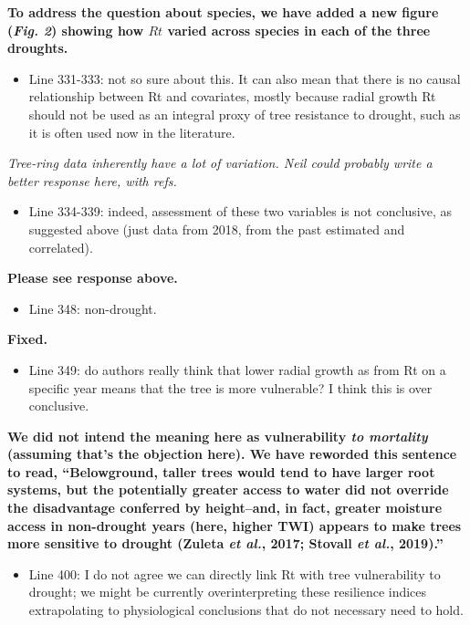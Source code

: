 \documentclass[
]{article}
\providecommand{\tightlist}{%
  \setlength{\itemsep}{0pt}\setlength{\parskip}{0pt}}
\begin{document}
\textbf{To address the question about species, we have added a new
figure (\emph{Fig. 2}) showing how \(Rt\) varied across species in each
of the three droughts.}

\begin{itemize}
\tightlist
\item
  Line 331-333: not so sure about this. It can also mean that there is
  no causal relationship between Rt and covariates, mostly because
  radial growth Rt should not be used as an integral proxy of tree
  resistance to drought, such as it is often used now in the literature.
\end{itemize}

\emph{Tree-ring data inherently have a lot of variation. Neil could
probably write a better response here, with refs.}

\begin{itemize}
\tightlist
\item
  Line 334-339: indeed, assessment of these two variables is not
  conclusive, as suggested above (just data from 2018, from the past
  estimated and correlated).
\end{itemize}

\textbf{Please see response above.}

\begin{itemize}
\tightlist
\item
  Line 348: non-drought.
\end{itemize}

\textbf{Fixed.}

\begin{itemize}
\tightlist
\item
  Line 349: do authors really think that lower radial growth as from Rt
  on a specific year means that the tree is more vulnerable? I think
  this is over conclusive.
\end{itemize}

\textbf{We did not intend the meaning here as vulnerability \emph{to
mortality} (assuming that's the objection here). We have reworded this
sentence to read, ``Belowground, taller trees would tend to have larger
root systems, but the potentially greater access to water did not
override the disadvantage conferred by height--and, in fact, greater
moisture access in non-drought years (here, higher TWI) appears to make
trees more sensitive to drought (Zuleta \emph{et al.}, 2017; Stovall
\emph{et al.}, 2019).''}

\begin{itemize}
\tightlist
\item
  Line 400: I do not agree we can directly link Rt with tree
  vulnerability to drought; we might be currently overinterpreting these
  resilience indices extrapolating to physiological conclusions that do
  not necessary need to hold.
\end{itemize}
\end{document}
